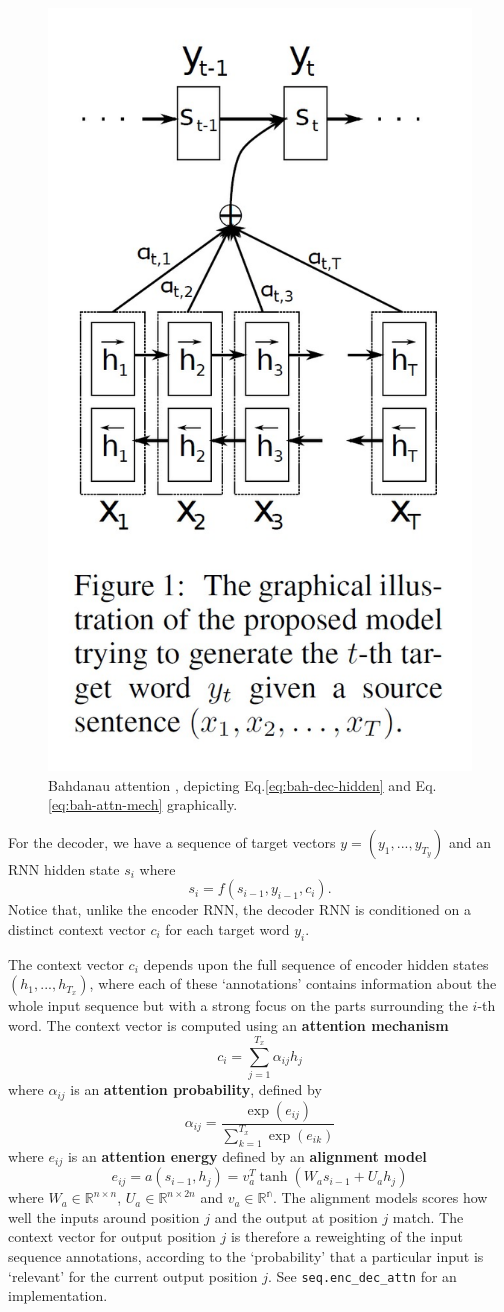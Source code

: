 \documentclass[11pt]{article}
\numberwithin{equation}{section}
\begin{document}
\begin{figure}
\begin{center}
\includegraphics[width=0.4\columnwidth]{../figures/enc-dec-attn.jpg}  
\end{center}
\caption{Bahdanau attention \citep{bahdanau14}, depicting Eq.\eqref{eq:bah-dec-hidden} and Eq.\eqref{eq:bah-attn-mech} graphically.}
\label{fig:bah-attn}
\end{figure}

For the decoder, we have a sequence of target vectors $y=(y_1,...,y_{T_y})$ and an RNN hidden state $s_i$ where
\begin{equation}
s_i = f(s_{i-1}, y_{i-1}, c_i). \label{eq:bah-dec-hidden}
\end{equation}
Notice that, unlike the encoder RNN, the decoder RNN is conditioned on a distinct context vector $c_i$ for each target word $y_i$.

The context vector $c_i$ depends upon the full sequence of encoder hidden states $(h_1, ..., h_{T_x})$, where each of these `annotations' contains information about the whole input sequence but with a strong focus on the parts surrounding the $i$-th word. The context vector is computed using an \textbf{attention mechanism}
\begin{equation}
c_i = \sum_{j=1}^{T_x} \alpha_{ij} h_j \label{eq:bah-attn-mech}
\end{equation}
where $\alpha_{ij}$ is an \textbf{attention probability}, defined by
\begin{equation}
\alpha_{ij} = \frac{\exp(e_{ij})}{\sum_{k=1}^{T_x}\exp(e_{ik})}
\end{equation}
where $e_{ij}$ is an \textbf{attention energy} defined by an \textbf{alignment model}
\begin{equation}
e_{ij} = a(s_{i-1}, h_j) = v_a^T \tanh(W_a s_{i-1} + U_a h_j)
\end{equation}
where $W_a \in \mathbb{R}^{n \times n}$, $U_a \in \mathbb{R}^{n \times 2n}$ and $v_a \in \mathbb{R^n}$. The alignment models scores how well the inputs around position $j$ and the output at position $j$ match. The context vector for output position $j$ is therefore a reweighting of the input sequence annotations, according to the `probability' that a particular input is `relevant' for the current output position $j$. See \verb#seq.enc_dec_attn# for an implementation.


\newpage
 
\end{document}
